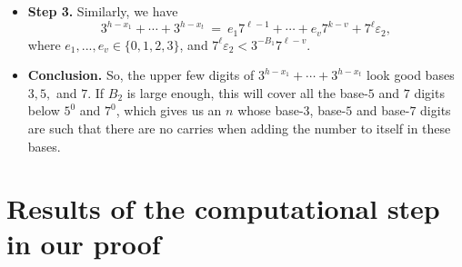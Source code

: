 \documentclass[12pt]{article}
\begin{document}
\begin{itemize}
\item \textbf{Step 3.} 
Similarly, we have
$$
3^{h-x_1} + \cdots + 3^{h-x_t}\ =\ e_1 7^{\ell-1} + \cdots + e_v 7^{k-v}
+ 7^\ell \varepsilon_2,
$$
where $e_1,...,e_v \in \{0,1,2,3\}$, and $7^\ell \varepsilon_2 < 
3^{-B_1} 7^{\ell-v}$.

\item \textbf{Conclusion.} 
So, the upper few digits of $3^{h-x_1} + \cdots + 3^{h-x_t}$ look good
bases $3,5,$ and $7$.  If $B_2$ is large enough, this will cover all 
the base-$5$ and $7$ digits below $5^0$ and $7^0$, which gives us an $n$
whose base-$3$, base-$5$ and base-$7$ digits are such that there are no
carries when adding the number to itself in these bases. 
\end{itemize} 

\section{Results of the computational step in our proof} 
\label{Section_CompStep} 
\end{document}
